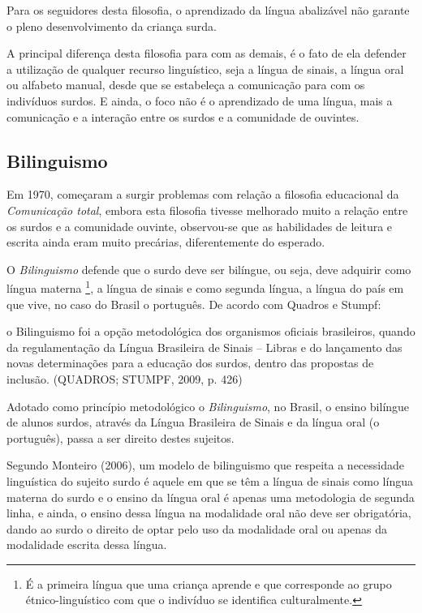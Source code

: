\documentclass[brasil]{abnt}
\begin{document}
		 Para os seguidores desta filosofia, o aprendizado da língua abalizável não garante o pleno desenvolvimento da criança surda.
		 
		 A principal diferença desta filosofia para com as demais, é o fato de ela defender a utilização de qualquer recurso linguístico, seja a língua de sinais, a língua oral ou alfabeto manual, desde que 
		 se estabeleça a comunicação para com os indivíduos surdos. E ainda, o foco não é o aprendizado de uma língua, mais a comunicação e a interação entre os surdos e a comunidade de ouvintes.
		 
		\subsection{Bilinguismo}
			Em 1970, começaram a surgir problemas com relação a filosofia educacional da \textit{Comunicação total}, embora esta filosofia tivesse melhorado muito a relação entre os surdos e a comunidade 
			ouvinte, observou-se que as habilidades de leitura e escrita ainda eram muito precárias, diferentemente do esperado. 
			
			O \textit{Bilinguismo} defende que o surdo deve ser bilíngue, ou seja, deve adquirir como língua materna \footnote{É a primeira língua que uma criança aprende e que corresponde ao grupo 
			étnico-linguístico com que o indivíduo se identifica culturalmente.}, a língua de sinais e como segunda língua, a língua do país em 
			que vive, no caso do Brasil o português. De acordo com Quadros e Stumpf:
			
				\begin{citacao}o Bilinguismo foi a opção metodológica dos organismos oficiais brasileiros, quando da regulamentação da Língua Brasileira de Sinais – Libras e do lançamento das novas 
								determinações para a educação dos surdos, dentro das propostas de inclusão. (QUADROS; STUMPF, 2009, p. 426)
				\end{citacao}
			
			Adotado como princípio metodológico o \textit{Bilinguismo}, no Brasil, o ensino bilíngue de alunos surdos, através da Língua Brasileira de Sinais e da língua oral (o português), passa a ser direito 
			destes sujeitos. 
			
			Segundo Monteiro (2006), um modelo de bilinguismo que respeita a necessidade linguística do sujeito surdo é aquele em que se têm a língua de sinais como língua materna do surdo e o ensino da língua 
			oral é apenas uma metodologia de segunda linha, e ainda, o ensino dessa língua na modalidade oral não deve ser obrigatória, dando ao surdo o direito de optar pelo uso da modalidade oral ou apenas 
			da modalidade escrita dessa língua.
						
\end{document}
